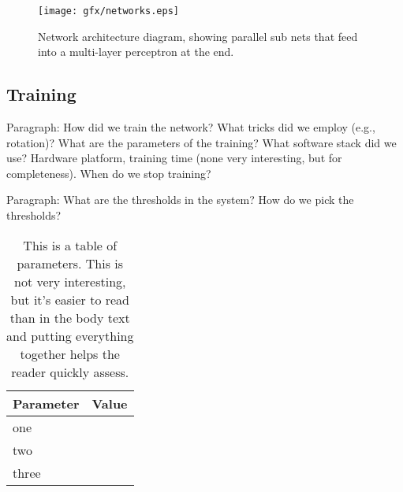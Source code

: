 \begin{figure}[t]
\texttt{[image: gfx/networks.eps]}
\caption{Network architecture diagram, showing parallel sub nets that feed into a multi-layer perceptron at the end.}
\end{figure}

\subsection{Training}

Paragraph: How did we train the network? What tricks did we employ (e.g., rotation)? What are the parameters of the training? What software stack did we use? Hardware platform, training time (none very interesting, but for completeness). When do we stop training?



Paragraph: What are the thresholds in the system? How do we pick the thresholds?


\begin{table}
\begin{tabular}{ll}
\toprule
Parameter & Value \\
\midrule
one & \\
two & \\
three & \\
\bottomrule
\end{tabular}
\caption{This is a table of parameters. This is not very interesting, but it's easier to read than in the body text and putting everything together helps the reader quickly assess.}
\end{table}